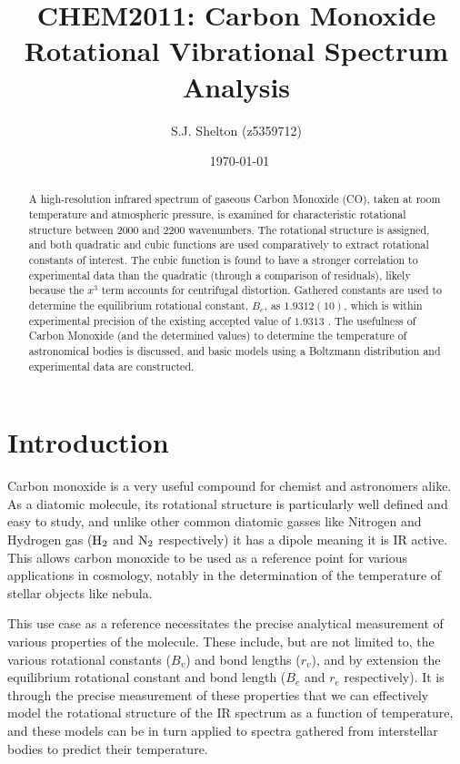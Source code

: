 \documentclass[aps,prl,reprint,10pt,amsmath,amssymb,superscriptaddress,a4paper]{revtex4-2}
\begin{document}
\title{CHEM2011: Carbon Monoxide Rotational Vibrational Spectrum Analysis}

\author{S.J. Shelton (z5359712)}
\date{\currenttime~\today}

\begin{abstract}
A high-resolution infrared spectrum of gaseous Carbon Monoxide (CO), taken at room temperature and atmospheric pressure, is examined for characteristic rotational structure between 2000 and 2200 wavenumbers. The rotational structure is assigned, and both quadratic and cubic functions are used comparatively to extract rotational constants of interest. The cubic function is found to have a stronger correlation to experimental data than the quadratic (through a comparison of residuals), likely because the $x^3$ term accounts for centrifugal distortion. Gathered constants are used to determine the equilibrium rotational constant, $B_e$, as $1.9312(10)$, which is within experimental precision of the existing accepted value of $1.9313$ \cite{NIST}. The usefulness of Carbon Monoxide (and the determined values) to determine the temperature of astronomical bodies is discussed, and basic models using a Boltzmann distribution and experimental data are constructed.
\end{abstract}

\maketitle

\section{Introduction}

Carbon monoxide is a very useful compound for chemist and astronomers alike. As a diatomic molecule, its rotational structure is particularly well defined and easy to study, and unlike other common diatomic gasses like Nitrogen and Hydrogen gas ($\textnormal{H}_2$ and $\textnormal{N}_2$ respectively) it has a dipole meaning it is IR active. This allows carbon monoxide to be used as a reference point for various applications in cosmology, notably in the determination of the temperature of stellar objects like nebula.

This use case as a reference necessitates the precise analytical measurement of various properties of the molecule. These include, but are not limited to, the various rotational constants ($B_v$) and bond lengths ($r_v$), and by extension the equilibrium rotational constant and bond length ($B_e$ and $r_e$ respectively). It is through the precise measurement of these properties that we can effectively model the rotational structure of the IR spectrum as a function of temperature, and these models can be in turn applied to spectra gathered from interstellar bodies to predict their temperature.
\end{document}
